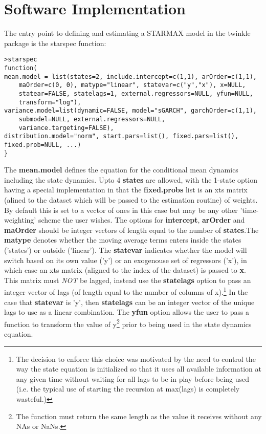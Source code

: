 \pagebreak
\section{Software Implementation}\label{sec:5}
The entry point to defining and estimating a STARMAX model in the twinkle
package is the starspec function:
\begin{lstlisting}
>starspec
function(
mean.model = list(states=2, include.intercept=c(1,1), arOrder=c(1,1), 
	maOrder=c(0, 0), matype="linear", statevar=c("y","x"), x=NULL, 
	statear=FALSE, statelags=1, external.regressors=NULL, yfun=NULL, 
	transform="log"), 
variance.model=list(dynamic=FALSE, model="sGARCH", garchOrder=c(1,1), 
	submodel=NULL, external.regressors=NULL, 
	variance.targeting=FALSE), 
distribution.model="norm", start.pars=list(), fixed.pars=list(), 
fixed.prob=NULL, ...)
}
\end{lstlisting}
The \textbf{mean.model} defines the equation for the conditional mean dynamics
including the state dynamics. Upto 4 \textbf{states} are allowed, with the
1-state option having a special implementation in that the \textbf{fixed.probs}
list is an xts matrix (alined to the dataset which will be passed to the
estimation routine) of weights. By default this is set to a vector of ones in
this case but may be any other 'time-weighting' scheme the user  wishes. The
options for \textbf{intercept}, \textbf{arOrder} and \textbf{maOrder} should be
integer vectors of length equal to the number of \textbf{states}.The
\textbf{matype} denotes whether the moving average terms enters inside the
states ('states') or outside ('linear'). The \textbf{statevar} indicates whether
the model will switch based on its own value ('y') or an exogenouse set of
regressors ('x'), in which case an xts matrix (aligned to the index of
the dataset) is passed to \textbf{x}. This matrix must \emph{NOT} be lagged,
instead use the \textbf{statelags} option to pass an integer vector of lags (of length equal to
the number of columns of x).\footnote{The decision to enforce this choice was
motivated by the need to control the way the state equation is initialized so
that it uses all available information at any given time without waiting for
all lags to be in play before being used (i.e. the typical use of
starting the recursion at max(lags) is completely wasteful.)}
In the case that \textbf{statevar} is 'y', then \textbf{statelags} can be an 
integer vector of the unique lags to use as a linear combination. The
\textbf{yfun}  option allows the user to pass a function to transform the value 
of y\footnote{The function must return the same length as the value it receives
without any NAs or NaNs.} prior to being used in the state dynamics equation.
